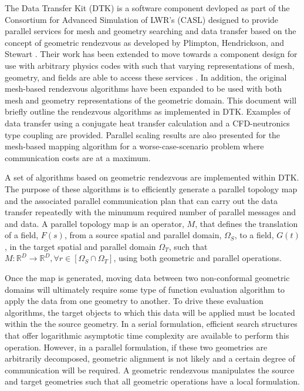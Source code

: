 \documentclass{mc2013}
\begin{document}
The Data Transfer Kit (DTK) is a software component devloped as part
of the Consortium for Advanced Simulation of LWR's (CASL)
\cite{u.s._department_of_energy_casl_2011} designed to provide
parallel services for mesh and geometry searching and data transfer
based on the concept of geometric rendezvous as developed by Plimpton,
Hendrickson, and Stewart \cite{Plimpton_2004}. Their work has been
extended to move towards a component design for use with arbitrary
physics codes with such that varying representations of mesh,
geometry, and fields are able to access these services
\cite{Chand_2008}. In addition, the original mesh-based rendezvous
algorithms have been expanded to be used with both mesh and geometry
representations of the geometric domain. This document will briefly
outline the rendezvous algorithms as implemented in DTK. Examples of
data transfer using a conjugate heat transfer calculation and a
CFD-neutronics type coupling are provided. Parallel scaling results
are also presented for the mesh-based mapping algorithm for a
worse-case-scenario problem where communication costs are at a
maximum.


\label{sec:geometric_rendezvous}

A set of algorithms based on geometric rendezvous are implemented
within DTK. The purpose of these algorithms is to efficiently generate
a parallel topology map and the associated parallel communication plan
that can carry out the data transfer repeatedly with the minumum
required number of parallel messages and and data. A parallel topology
map is an operator, $M$, that defines the translation of a field,
$F(s)$, from a source spatial and parallel domain, $\Omega_S$, to a
field, $G(t)$, in the target spatial and parallel domain $\Omega_T$,
such that $M: \mathbb{R}^D \rightarrow \mathbb{R}^D, \forall r \in
[\Omega_S \cap \Omega_T]$, using both geometric and parallel
operations.

Once the map is generated, moving data between two non-conformal
geometric domains will ultimately require some type of function
evaluation algorithm to apply the data from one geometry to
another. To drive these evaluation algorithms, the target objects to
which this data will be applied must be located within the the source
geometry. In a serial formulation, efficient search structures that
offer logarithmic asymptotic time complexity are available to perform
this operation. However, in a parallel formulation, if these two
geometries are arbitrarily decomposed, geometric alignment is not
likely and a certain degree of communication will be required. A
geometric rendezvous manipulates the source and target geometries such
that all geometric operations have a local formulation.
\end{document}

